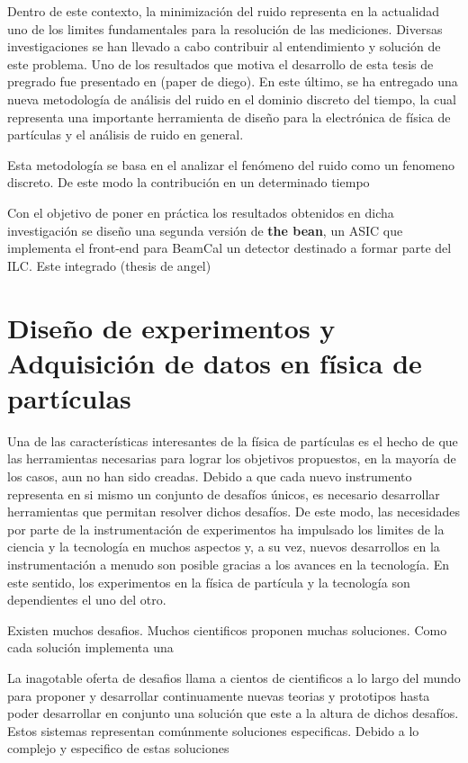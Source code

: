 Dentro de este contexto, la minimización del ruido representa en la actualidad uno de los limites fundamentales para la resolución de las mediciones. Diversas investigaciones se han llevado a cabo contribuir al entendimiento y solución de este problema. Uno de los resultados que motiva el desarrollo de esta tesis de pregrado fue presentado en (paper de diego). En este último, se ha entregado una nueva metodología de análisis del ruido en el dominio discreto del tiempo, la cual representa una importante herramienta de diseño para la electrónica de física de partículas y el análisis de ruido en general. 

Esta metodología se basa en el analizar el fenómeno del ruido como un fenomeno discreto. De este modo la contribución en un determinado tiempo


Con el objetivo de poner en práctica los resultados obtenidos en dicha investigación se diseño una segunda versión de \textbf{the bean}, un ASIC que implementa el front-end para BeamCal un detector destinado a formar parte del ILC. Este integrado  (thesis de angel)


 


\section{Diseño de experimentos y Adquisición de datos en física de partículas}

Una de las características interesantes de la física de partículas es el hecho de que las herramientas necesarias para lograr los objetivos propuestos, en la mayoría de los casos, aun no han sido creadas. Debido a que cada nuevo instrumento representa en si mismo un conjunto de desafíos únicos, es necesario desarrollar herramientas que permitan resolver dichos desafíos. De este modo, las necesidades por parte de la instrumentación de experimentos ha impulsado los limites de la ciencia y la tecnología en muchos aspectos y, a su vez, nuevos desarrollos en la instrumentación a menudo son posible gracias a los avances en la tecnología.  En este sentido, los experimentos en la física de partícula y la tecnología son dependientes el uno del otro. \citep{Attila}

Existen muchos desafios.
Muchos cientificos proponen muchas soluciones.
Como cada solución implementa una



La inagotable oferta de desafios llama a cientos de cientificos a lo largo del mundo para proponer y desarrollar continuamente nuevas teorias y prototipos hasta poder desarrollar en conjunto una solución que este a la altura de dichos desafíos. Estos sistemas representan comúnmente soluciones especificas. Debido a lo complejo y especifico de estas soluciones 



